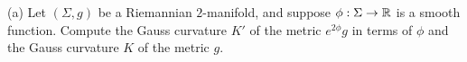 \documentclass{../../templates/lkx_pset}
\begin{document}
\begin{problem}{6}
\end{problem}
\begin{parts}
  \begin{part}{(a)}
    Let $(\Sigma, g)$ be a Riemannian $2$-manifold, and suppose $\phi : \Sigma \to \mathbb{R}$ is a smooth function. Compute the Gauss curvature $K'$ of the metric $e^{2\phi}g$ in terms of $\phi$ and the Gauss curvature $K$ of the metric $g$.
  \end{part}
\end{parts}
\end{document}

